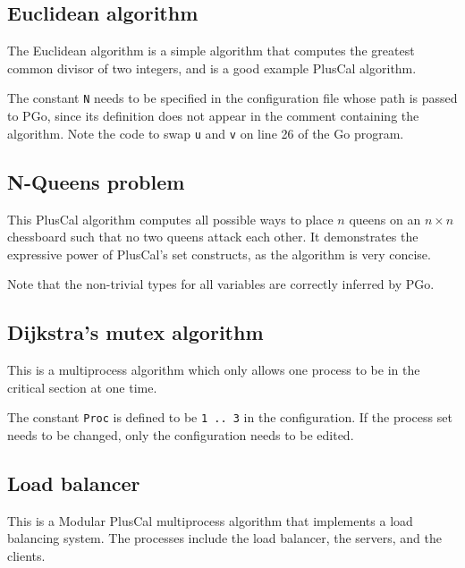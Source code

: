 \subsection{Euclidean algorithm}
The Euclidean algorithm is a simple algorithm that computes the greatest common divisor of two integers, and is a good example PlusCal algorithm.





The constant \lstinline[language=pcal]|N| needs to be specified in the configuration file whose path is passed to PGo, since its definition does not appear in the comment containing the algorithm. Note the code to swap \lstinline[language=pcal]|u| and \lstinline[language=pcal]|v| on line 26 of the Go program.

\subsection{N-Queens problem}
This PlusCal algorithm computes all possible ways to place $n$ queens on an $n \times n$ chessboard such that no two queens attack each other. It demonstrates the expressive power of PlusCal's set constructs, as the algorithm is very concise.





Note that the non-trivial types for all variables are correctly inferred by PGo.

\subsection{Dijkstra's mutex algorithm}
This is a multiprocess algorithm which only allows one process to be in the critical section at one time.





The constant \lstinline[language=pcal]|Proc| is defined to be \lstinline[language=pcal]|1 .. 3| in the configuration. If the process set needs to be changed, only the configuration needs to be edited.

\subsection{Load balancer}
This is a Modular PlusCal multiprocess algorithm that implements a load balancing system. The processes include the load balancer, the servers, and the clients.


